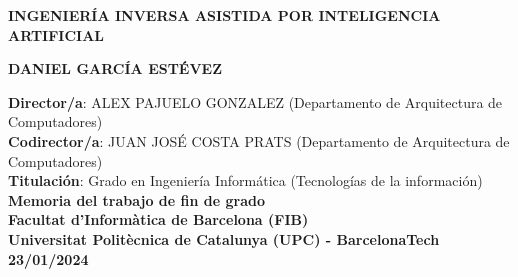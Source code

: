 \thispagestyle{empty}

\begin{figure}[htb]
  \centerline{}
\end{figure}

\begin{center}
  \vspace{2cm}
  {\Large {\bf INGENIERÍA INVERSA ASISTIDA POR INTELIGENCIA ARTIFICIAL}}
 
  \vspace{8cm}
  {\large {\bf DANIEL GARCÍA ESTÉVEZ}}
  
  \vfill
  {\bf Director/a}: ALEX PAJUELO GONZALEZ (Departamento de Arquitectura de Computadores) \\
  {\bf Codirector/a}: JUAN JOSÉ COSTA PRATS (Departamento de Arquitectura de Computadores) \\
  {\bf Titulación}: Grado en Ingeniería Informática (Tecnologías de la información) \\
  \vspace{0.5cm}
  {\bf Memoria del trabajo de fin de grado} \\
  {\bf Facultat d'Informàtica de Barcelona (FIB)} \\
  {\bf Universitat Politècnica de Catalunya (UPC) - BarcelonaTech} \\
  \vspace{0.5cm}
  {\bf 23/01/2024} \\
\end{center}
